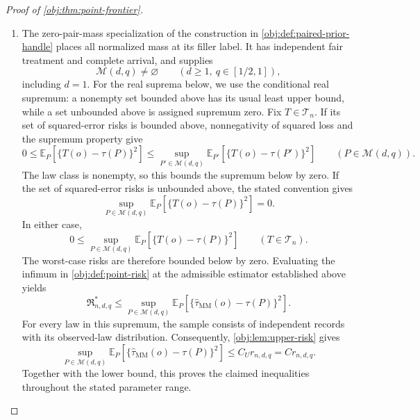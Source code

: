 \begin{proof}[Proof of \cref{obj:thm:point-frontier}]
\begin{enumerate}
The Poisson weights satisfy
\[
\omega_{n,N}\ge0,
\qquad
0\le\sum_{N=0}^{n}\omega_{n,N}
\le\sum_{N=0}^{\infty}\omega_{n,N}=1.
\]
Since the randomized estimate is zero when \(N>n\), its conditional average is
\[
\widehat\tau_{\mathrm{MM}}(o)
=\sum_{N=0}^{n}\omega_{n,N}\overline\tau_N(o)
\]
in this branch. Multiplying the bounds on each average by its nonnegative weight and summing gives
\[
-1
\le-\sum_{N=0}^{n}\omega_{n,N}
\le\widehat\tau_{\mathrm{MM}}(o)
\le\sum_{N=0}^{n}\omega_{n,N}
\le1.
\]
The projected formulas and finite averages are measurable. Thus, on the entire Cartesian sample space,
\[
\widehat\tau_{\mathrm{MM}}\in\mathcal T_n,
\]
with \(\mathcal T_n\) as defined in \cref{obj:synth_6}.

\item The zero-pair-mass specialization of the construction in \cref{obj:def:paired-prior-handle} places all normalized mass at its filler label. It has independent fair treatment and complete arrival, and supplies
\[
\mathcal M(d,q)\ne\varnothing
\qquad(d\ge1,\ q\in[1/2,1]),
\]
including \(d=1\). For the real suprema below, we use the conditional real supremum: a nonempty set bounded above has its usual least upper bound, while a set unbounded above is assigned supremum zero. Fix \(T\in\mathcal T_n\). If its set of squared-error risks is bounded above, nonnegativity of squared loss and the supremum property give
\[
0\le
\mathbb E_P\!\left[
\{T(o)-\tau(P)\}^{2}
\right]
\le
\sup_{P'\in\mathcal M(d,q)}
\mathbb E_{P'}\!\left[
\{T(o)-\tau(P')\}^{2}
\right]
\qquad(P\in\mathcal M(d,q)).
\]
The law class is nonempty, so this bounds the supremum below by zero. If the set of squared-error risks is unbounded above, the stated convention gives
\[
\sup_{P\in\mathcal M(d,q)}
\mathbb E_P\!\left[
\{T(o)-\tau(P)\}^{2}
\right]=0.
\]
In either case,
\[
0\le
\sup_{P\in\mathcal M(d,q)}
\mathbb E_P\!\left[
\{T(o)-\tau(P)\}^{2}
\right]
\qquad(T\in\mathcal T_n).
\]
The worst-case risks are therefore bounded below by zero. Evaluating the infimum in \cref{obj:def:point-risk} at the admissible estimator established above yields
\[
\mathfrak R^*_{n,d,q}
\le
\sup_{P\in\mathcal M(d,q)}
\mathbb E_P\!\left[
\{\widehat\tau_{\mathrm{MM}}(o)-\tau(P)\}^{2}
\right].
\]
For every law in this supremum, the sample consists of independent records with its observed-law distribution. Consequently, \cref{obj:lem:upper-risk} gives
\[
\sup_{P\in\mathcal M(d,q)}
\mathbb E_P\!\left[
\{\widehat\tau_{\mathrm{MM}}(o)-\tau(P)\}^{2}
\right]
\le C_U r_{n,d,q}
=C r_{n,d,q}.
\]
Together with the lower bound, this proves the claimed inequalities throughout the stated parameter range.
\end{enumerate}
\end{proof}

